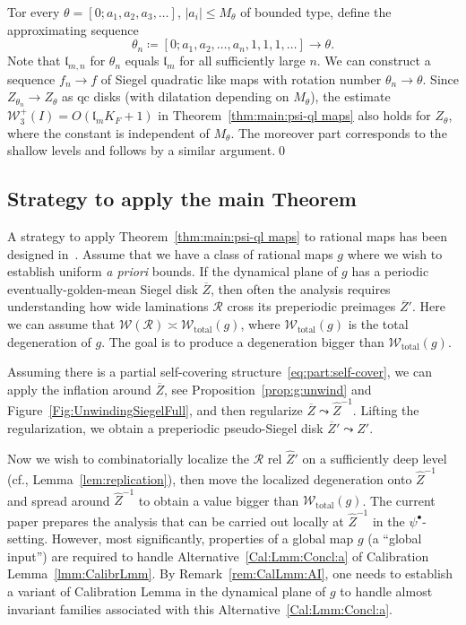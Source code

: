 \documentclass{amsart}
\newcommand{\1}{{\mathbb 1 }}
\newcommand{\Width}{{\mathcal W}}
\newcommand\RR{\mathcal{R}}
\newcommand{\wZ}{{\widehat Z}}
\newcommand{\length}{{\mathfrak l}}
\theoremstyle{remark}
\numberwithin{equation}{section}
\theoremstyle{definition}
\begin{document}
    Tor every $\theta=[0;a_1,a_2,a_3, \dots]$, $|a_i|\le M_\theta$ of bounded type, define the approximating sequence
\[\theta_{n}\coloneqq [0;a_1,a_2,\dots, a_n,1,1,1,\dots]\to \theta.\]
    Note that $\length_{m,n}$ for $\theta_n$ equals $\length_m$ for all sufficiently large $n$.
    We can construct a sequence $f_n \to f$ of Siegel quadratic like maps with rotation number $\theta_n \to \theta$.
    Since $Z_{\theta_n}\to Z_{\theta}$ as qc disks (with dilatation depending on $M_\theta$), the estimate $\Width^+_3(I) =O(\length_m K_F+1)$ in Theorem~\ref{thm:main:psi-ql maps} also holds for $Z_\theta$, where the constant is independent of $M_\theta$. The moreover part corresponds to the shallow levels and follows by a similar argument.\qed


\subsection{Strategy to apply the main Theorem} \label{ss:Application} A strategy to apply Theorem~\ref{thm:main:psi-ql maps} to rational maps has been designed in~\cite{DL:HypComp}. Assume that we have a class of rational maps $g$ where we wish to establish uniform \emph{a priori} bounds. If the dynamical plane of $g$ has a periodic eventually-golden-mean Siegel disk $\overline Z$, then often the analysis requires understanding how wide laminations $\RR$ cross its preperiodic preimages $\overline Z'$. Here we can assume that $\Width(\RR)\asymp \Width_\text{total}(g)$, where $\Width_\text{total}(g)$ is the total degeneration of $g$. The goal is to produce a degeneration bigger than $\Width_\text{total}(g)$.

Assuming there is a partial self-covering structure~\eqref{eq:part:self-cover}, we can apply the inflation around $\overline Z$, see Proposition~\ref{prop:g:unwind} and Figure~\ref{Fig:UnwindingSiegelFull}, and then regularize $\overline Z\leadsto \wZ^{-1}$. Lifting the regularization, we obtain a preperiodic pseudo-Siegel disk $\overline Z'\leadsto \wZ'$.  

Now we wish to combinatorially localize the $\RR$ rel $\wZ'$ on a sufficiently deep level (cf., Lemma~\ref{lem:replication}), then move the localized degeneration onto $\wZ^{-1}$ and spread around $\wZ^{-1}$ to obtain a value bigger than $\Width_\text{total}(g)$. The current paper prepares the analysis that can be carried out locally at $\wZ^{-1}$ in the $\psi^\bullet$-setting. However, most significantly, properties of a global map $g$ (a ``global input'') are required to handle Alternative~\ref{Cal:Lmm:Concl:a} of Calibration Lemma~\ref{lmm:CalibrLmm}. By Remark~\ref{rem:CalLmm:AI}, one needs to establish a variant of Calibration Lemma in the dynamical plane of $g$ to handle almost invariant families associated with this Alternative~\ref{Cal:Lmm:Concl:a}.
\end{document}
